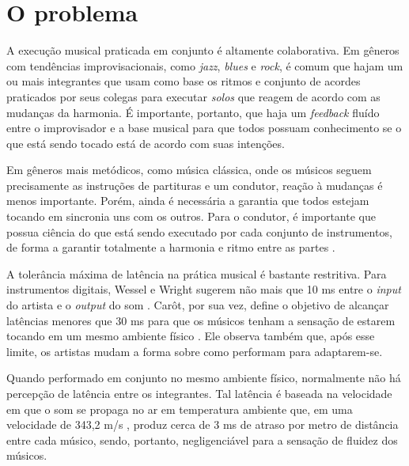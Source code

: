 \section{O problema}
\label{sec:problem}


A execução musical praticada em conjunto é altamente colaborativa. Em gêneros com tendências improvisacionais, como \textit{jazz}, \textit{blues} e \textit{rock}, é comum que hajam um ou mais integrantes que usam como base os ritmos e conjunto de acordes praticados por seus colegas para executar \textit{solos} que reagem de acordo com as mudanças da harmonia. É importante, portanto, que haja um \textit{feedback} fluído entre o improvisador e a base musical para que todos possuam conhecimento se o que está sendo tocado está de acordo com suas intenções.

Em gêneros mais metódicos, como música clássica, onde os músicos seguem precisamente as instruções de partituras e um condutor, reação à mudanças é menos importante. Porém, ainda é necessária a garantia que todos estejam tocando em sincronia uns com os outros. Para o condutor, é importante que possua ciência do que está sendo executado por cada conjunto de instrumentos, de forma a garantir totalmente a harmonia e ritmo entre as partes \cite{conductor_role}.

A tolerância máxima de latência na prática musical é bastante restritiva. Para instrumentos digitais, Wessel e Wright sugerem não mais que 10 ms entre o \textit{input} do artista e o \textit{output} do som \cite{digital_instrument_latency}. Carôt, por sua vez, define o objetivo de alcançar latências menores que 30 ms para que os músicos tenham a sensação de estarem tocando em um mesmo ambiente físico \cite{carot_low_latency}. Ele observa também que, após esse limite, os artistas mudam a forma sobre como performam para adaptarem-se.

Quando performado em conjunto no mesmo ambiente físico, normalmente não há percepção de latência entre os integrantes. Tal latência é baseada na velocidade em que o som se propaga no ar em temperatura ambiente que, em uma velocidade de 343,2 m/s \cite{speed_of_sound}, produz cerca de 3 ms de atraso por metro de distância entre cada músico, sendo, portanto, negligenciável para a sensação de fluidez dos músicos.

